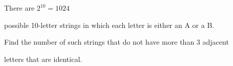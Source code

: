 There are $2^{10}=1024$

 possible 10-letter strings in which each letter is either an A or a B. 

Find the number of such strings that do not have more than 3 adjacent 

letters that are identical.